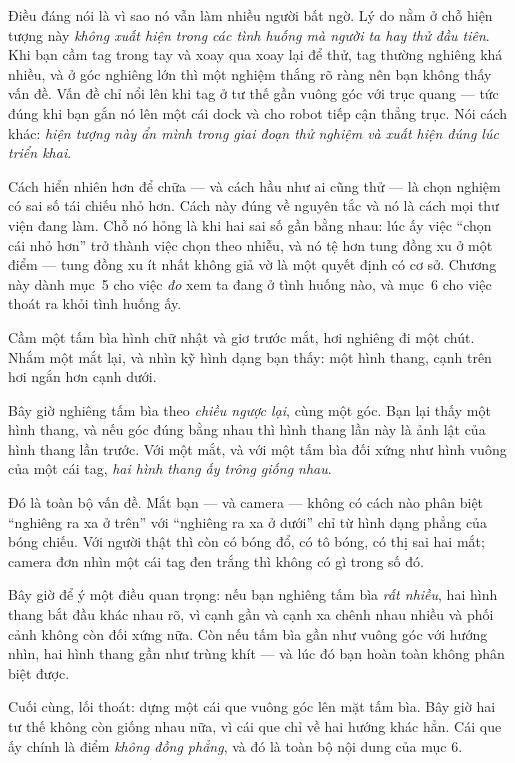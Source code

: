\documentclass[../../marker.tex]{subfiles}
\begin{document}
Điều đáng nói là vì sao nó vẫn làm nhiều người bất ngờ. Lý do nằm ở chỗ hiện tượng này \emph{không xuất hiện trong các tình huống mà người ta hay thử đầu tiên}. Khi bạn cầm tag trong tay và xoay qua xoay lại để thử, tag thường nghiêng khá nhiều, và ở góc nghiêng lớn thì một nghiệm thắng rõ ràng nên bạn không thấy vấn đề. Vấn đề chỉ nổi lên khi tag ở tư thế gần vuông góc với trục quang --- tức đúng khi bạn gắn nó lên một cái dock và cho robot tiếp cận thẳng trục. Nói cách khác: \emph{hiện tượng này ẩn mình trong giai đoạn thử nghiệm và xuất hiện đúng lúc triển khai}.

Cách hiển nhiên hơn để chữa --- và cách hầu như ai cũng thử --- là chọn nghiệm có sai số tái chiếu nhỏ hơn. Cách này đúng về nguyên tắc và nó là cách mọi thư viện đang làm. Chỗ nó hỏng là khi hai sai số gần bằng nhau: lúc ấy việc ``chọn cái nhỏ hơn'' trở thành việc chọn theo nhiễu, và nó tệ hơn tung đồng xu ở một điểm --- tung đồng xu ít nhất không giả vờ là một quyết định có cơ sở. Chương này dành mục~5 cho việc \emph{đo} xem ta đang ở tình huống nào, và mục~6 cho việc thoát ra khỏi tình huống ấy.

\begin{trucgiac}
Cầm một tấm bìa hình chữ nhật và giơ trước mắt, hơi nghiêng đi một chút. Nhắm một mắt lại, và nhìn kỹ hình dạng bạn thấy: một hình thang, cạnh trên hơi ngắn hơn cạnh dưới.

Bây giờ nghiêng tấm bìa theo \emph{chiều ngược lại}, cùng một góc. Bạn lại thấy một hình thang, và nếu góc đúng bằng nhau thì hình thang lần này là ảnh lật của hình thang lần trước. Với một mắt, và với một tấm bìa đối xứng như hình vuông của một cái tag, \emph{hai hình thang ấy trông giống nhau}.

Đó là toàn bộ vấn đề. Mắt bạn --- và camera --- không có cách nào phân biệt ``nghiêng ra xa ở trên'' với ``nghiêng ra xa ở dưới'' chỉ từ hình dạng phẳng của bóng chiếu. Với người thật thì còn có bóng đổ, có tô bóng, có thị sai hai mắt; camera đơn nhìn một cái tag đen trắng thì không có gì trong số đó.

Bây giờ để ý một điều quan trọng: nếu bạn nghiêng tấm bìa \emph{rất nhiều}, hai hình thang bắt đầu khác nhau rõ, vì cạnh gần và cạnh xa chênh nhau nhiều và phối cảnh không còn đối xứng nữa. Còn nếu tấm bìa gần như vuông góc với hướng nhìn, hai hình thang gần như trùng khít --- và lúc đó bạn hoàn toàn không phân biệt được.

Cuối cùng, lối thoát: dựng một cái que vuông góc lên mặt tấm bìa. Bây giờ hai tư thế không còn giống nhau nữa, vì cái que chỉ về hai hướng khác hẳn. Cái que ấy chính là điểm \emph{không đồng phẳng}, và đó là toàn bộ nội dung của mục 6.
\end{trucgiac}
\end{document}
